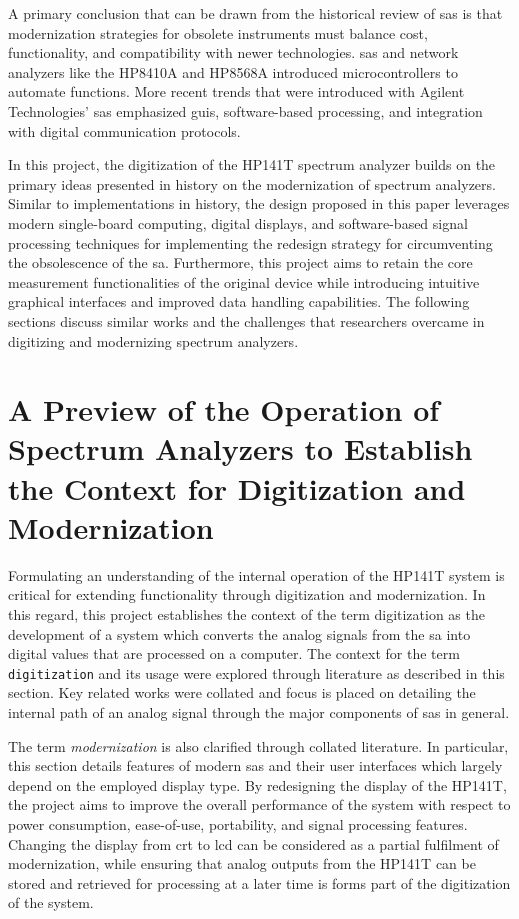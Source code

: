 \documentclass[class=report,11pt,crop=false]{standalone}
\begin{document}
A primary conclusion that can be drawn from the historical review of \acrshort{sa}s is that modernization strategies for obsolete instruments must balance cost, functionality, and compatibility with newer technologies. \acrshort{sa}s and network analyzers like the HP8410A and HP8568A introduced microcontrollers to automate functions. More recent trends that were introduced with Agilent Technologies' \acrshort{sa}s emphasized \acrshort{gui}s, software-based processing, and integration with digital communication protocols. 

In this project, the digitization of the HP141T spectrum analyzer builds on the primary ideas presented in history on the modernization of spectrum analyzers. Similar to implementations in history, the design proposed in this paper leverages modern single-board computing, digital displays, and software-based signal processing techniques for implementing the redesign strategy for circumventing the obsolescence of the \acrshort{sa}. Furthermore, this project aims to retain the core measurement functionalities of the original device while introducing intuitive graphical interfaces and improved data handling capabilities. The following sections discuss similar works and the challenges that researchers overcame in digitizing and modernizing spectrum analyzers.

\section{A Preview of the Operation of Spectrum Analyzers to Establish the Context for Digitization and Modernization}

Formulating an understanding of the internal operation of the HP141T system is critical for extending functionality through digitization and modernization. In this regard, this project establishes the context of the term digitization as the development of a system which converts the analog signals from the \acrshort{sa} into digital values that are processed on a computer. The context for the term \texttt{digitization} and its usage were explored through literature as described in this section. Key related works were collated and focus is placed on detailing the internal path of an analog signal through the major components of \acrshort{sa}s in general.

The term \textit{modernization} is also clarified through collated literature. In particular, this section details features of modern \acrshort{sa}s and their user interfaces which largely depend on the employed display type. By redesigning the display of the HP141T, the project aims to improve the overall performance of the system with respect to power consumption, ease-of-use, portability, and signal processing features. Changing the display from \acrshort{crt} to \acrshort{lcd} can be considered as a partial fulfilment of modernization, while ensuring that analog outputs from the HP141T can be stored and retrieved for processing at a later time is forms part of the digitization of the system.
\end{document}
